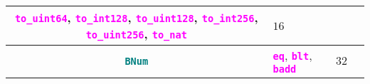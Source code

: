 \documentclass[9pt]{article}
\begin{document}
\begin{table}[!hbt]
\begin{tabular}{|c|p{4.1cm}|c|p{5cm}|}
		 \textbf{\texttt{\textcolor{magenta}{to\_uint64}}},
		 \textbf{\texttt{\textcolor{magenta}{to\_int128}}},
		 \textbf{\texttt{\textcolor{magenta}{to\_uint128}}},
		 \textbf{\texttt{\textcolor{magenta}{to\_int256}}},
		 \textbf{\texttt{\textcolor{magenta}{to\_uint256}}},
		 \textbf{\texttt{\textcolor{magenta}{to\_nat}}}
		 & $ 16 $  & \\ \hline \hline
		\textbf{\texttt{\textcolor{teal}{BNum}}} &
		\textbf{\texttt{\textcolor{magenta}{eq}}},
		\textbf{\texttt{\textcolor{magenta}{blt}}},
		\textbf{\texttt{\textcolor{magenta}{badd}}} & $32$  & \\ \hline 
	\end{tabular}
\end{table}




\end{document}

